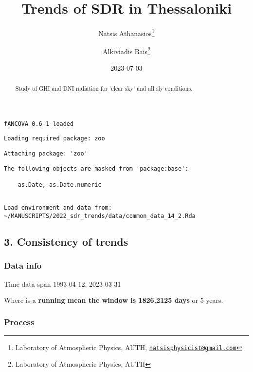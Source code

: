 \documentclass[
  10pt,
  a4paper,oneside]{article}
\title{Trends of SDR in Thessaloniki}
\author{Natsis Athanasios\footnote{Laboratory of Atmospheric Physics, AUTH, \href{mailto:natsisphysicist@gmail.com}{\nolinkurl{natsisphysicist@gmail.com}}} \and Alkiviadis Bais\footnote{Laboratory of Atmospheric Physics, AUTH}}
\date{2023-07-03}
\begin{document}
\maketitle
\begin{abstract}
Study of GHI and DNI radiation for `clear sky' and all sly conditions.
\end{abstract}

{
\hypersetup{linkcolor=}
\setcounter{tocdepth}{4}
\tableofcontents
}
\begin{verbatim}
fANCOVA 0.6-1 loaded
\end{verbatim}

\begin{verbatim}
Loading required package: zoo
\end{verbatim}

\begin{verbatim}
Attaching package: 'zoo'
\end{verbatim}

\begin{verbatim}
The following objects are masked from 'package:base':

    as.Date, as.Date.numeric
\end{verbatim}

\begin{verbatim}

Load environment and data from:  ~/MANUSCRIPTS/2022_sdr_trends/data/common_data_14_2.Rda 
\end{verbatim}

\hypertarget{consistency-of-trends}{%
\subsection{3. Consistency of trends}\label{consistency-of-trends}}

\hypertarget{data-info}{%
\subsubsection{Data info}\label{data-info}}

Time data span 1993-04-12, 2023-03-31

Where is a \textbf{running mean the window is 1826.2125 days} or
5 years.

\hypertarget{process}{%
\subsubsection{Process}\label{process}}

\newpage
\FloatBarrier
\end{document}
